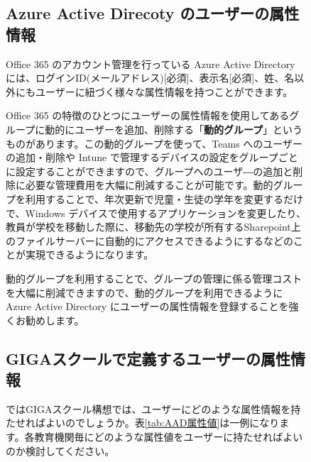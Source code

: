 \begin{figure}[]
    \subsection{Azure Active Direcoty のユーザーの属性情報}

    \hspace{8pt} Office 365 のアカウント管理を行っている Azure Active Directory には、ログインID(メールアドレス)[必須]、表示名[必須]、姓、名以外にもユーザーに紐づく様々な属性情報を持つことができます。

    \hspace{8pt} Office 365 の特徴のひとつにユーザーの属性情報を使用してあるグループに動的にユーザーを追加、削除する「\textbf{動的グループ}」というものがあります。この動的グループを使って、Teams へのユーザーの追加・削除や Intune で管理するデバイスの設定をグループごとに設定することができますので、グループへのユーザ―の追加と削除に必要な管理費用を大幅に削減することが可能です。動的グループを利用することで、年次更新で児童・生徒の学年を変更するだけで、Windows デバイスで使用するアプリケーションを変更したり、教員が学校を移動した際に、移動先の学校が所有するSharepoint上のファイルサーバーに自動的にアクセスできるようにするなどのことが実現できるようになります。

    \hspace{8pt} 動的グループを利用することで、グループの管理に係る管理コストを大幅に削減できますので、動的グループを利用できるように Azure Active Directory にユーザーの属性情報を登録することを強くお勧めします。
\end{figure}
\vspace{6cm}




\begin{figure}[]
    \subsection{GIGAスクールで定義するユーザーの属性情報}

    \hspace{8pt} ではGIGAスクール構想では、ユーザーにどのような属性情報を持たせればよいのでしょうか。表\ref{tab:AAD属性値}は一例になります。各教育機関毎にどのような属性値をユーザーに持たせればよいのか検討してください。
\end{figure}


